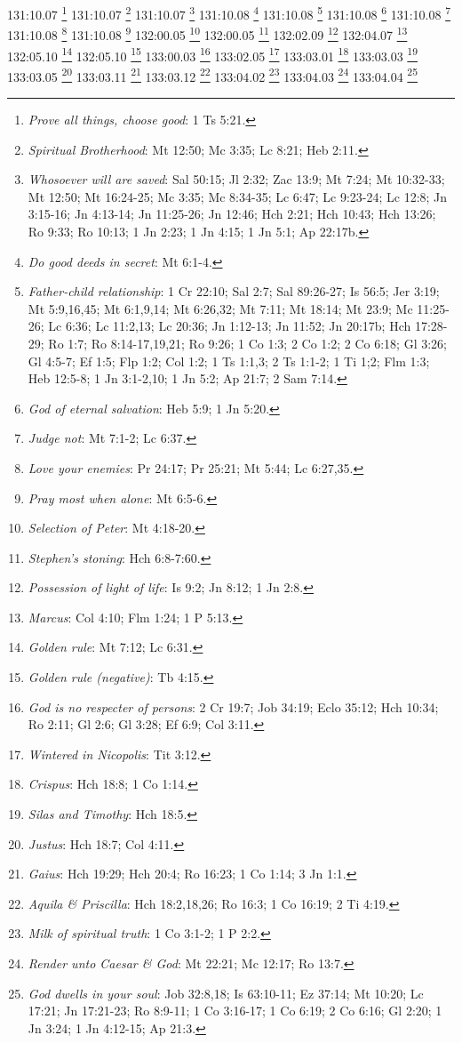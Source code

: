 {{{{{{{{{{{131:10.07 \footnote{\textit{Prove all things, choose good}: 1 Ts 5:21.}
131:10.07 \footnote{\textit{Spiritual Brotherhood}: Mt 12:50; Mc 3:35; Lc 8:21; Heb 2:11.}
131:10.07 \footnote{\textit{Whosoever will are saved}: Sal 50:15; Jl 2:32; Zac 13:9; Mt 7:24; Mt 10:32-33; Mt 12:50; Mt 16:24-25; Mc 3:35; Mc 8:34-35; Lc 6:47; Lc 9:23-24; Lc 12:8; Jn 3:15-16; Jn 4:13-14; Jn 11:25-26; Jn 12:46; Hch 2:21; Hch 10:43; Hch 13:26; Ro 9:33; Ro 10:13; 1 Jn 2:23; 1 Jn 4:15; 1 Jn 5:1; Ap 22:17b.}
131:10.08 \footnote{\textit{Do good deeds in secret}: Mt 6:1-4.}
131:10.08 \footnote{\textit{Father-child relationship}: 1 Cr 22:10; Sal 2:7; Sal 89:26-27; Is 56:5; Jer 3:19; Mt 5:9,16,45; Mt 6:1,9,14; Mt 6:26,32; Mt 7:11; Mt 18:14; Mt 23:9; Mc 11:25-26; Lc 6:36; Lc 11:2,13; Lc 20:36; Jn 1:12-13; Jn 11:52; Jn 20:17b; Hch 17:28-29; Ro 1:7; Ro 8:14-17,19,21; Ro 9:26; 1 Co 1:3; 2 Co 1:2; 2 Co 6:18; Gl 3:26; Gl 4:5-7; Ef 1:5; Flp 1:2; Col 1:2; 1 Ts 1:1,3; 2 Ts 1:1-2; 1 Ti 1;2; Flm 1:3; Heb 12:5-8; 1 Jn 3:1-2,10; 1 Jn 5:2; Ap 21:7; 2 Sam 7:14.}
131:10.08 \footnote{\textit{God of eternal salvation}: Heb 5:9; 1 Jn 5:20.}
131:10.08 \footnote{\textit{Judge not}: Mt 7:1-2; Lc 6:37.}
131:10.08 \footnote{\textit{Love your enemies}: Pr 24:17; Pr 25:21; Mt 5:44; Lc 6:27,35.}
131:10.08 \footnote{\textit{Pray most when alone}: Mt 6:5-6.}
132:00.05 \footnote{\textit{Selection of Peter}: Mt 4:18-20.}
132:00.05 \footnote{\textit{Stephen's stoning}: Hch 6:8-7:60.}
132:02.09 \footnote{\textit{Possession of light of life}: Is 9:2; Jn 8:12; 1 Jn 2:8.}
132:04.07 \footnote{\textit{Marcus}: Col 4:10; Flm 1:24; 1 P 5:13.}
132:05.10 \footnote{\textit{Golden rule}: Mt 7:12; Lc 6:31.}
132:05.10 \footnote{\textit{Golden rule (negative)}: Tb 4:15.}
133:00.03 \footnote{\textit{God is no respecter of persons}: 2 Cr 19:7; Job 34:19; Eclo 35:12; Hch 10:34; Ro 2:11; Gl 2:6; Gl 3:28; Ef 6:9; Col 3:11.}
133:02.05 \footnote{\textit{Wintered in Nicopolis}: Tit 3:12.}
133:03.01 \footnote{\textit{Crispus}: Hch 18:8; 1 Co 1:14.}
133:03.03 \footnote{\textit{Silas and Timothy}: Hch 18:5.}
133:03.05 \footnote{\textit{Justus}: Hch 18:7; Col 4:11.}
133:03.11 \footnote{\textit{Gaius}: Hch 19:29; Hch 20:4; Ro 16:23; 1 Co 1:14; 3 Jn 1:1.}
133:03.12 \footnote{\textit{Aquila & Priscilla}: Hch 18:2,18,26; Ro 16:3; 1 Co 16:19; 2 Ti 4:19.}
133:04.02 \footnote{\textit{Milk of spiritual truth}: 1 Co 3:1-2; 1 P 2:2.}
133:04.03 \footnote{\textit{Render unto Caesar & God}: Mt 22:21; Mc 12:17; Ro 13:7.}
133:04.04 \footnote{\textit{God dwells in your soul}: Job 32:8,18; Is 63:10-11; Ez 37:14; Mt 10:20; Lc 17:21; Jn 17:21-23; Ro 8:9-11; 1 Co 3:16-17; 1 Co 6:19; 2 Co 6:16; Gl 2:20; 1 Jn 3:24; 1 Jn 4:12-15; Ap 21:3.}
}}}}}}}}}}}
